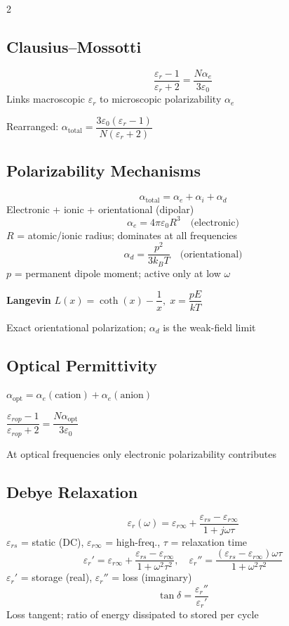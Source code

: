 \documentclass[9pt]{extarticle}
\newcommand{\eqlabel}[1]{\textbf{\scriptsize #1}\;}
\newcommand{\desc}[1]{{\small\color{desc}#1}}
\begin{document}
\begin{multicols}{2}
\subsection{Clausius--Mossotti}
\[\frac{\varepsilon_r - 1}{\varepsilon_r + 2} = \frac{N\alpha_e}{3\varepsilon_0}\]
\desc{Links macroscopic $\varepsilon_r$ to microscopic polarizability $\alpha_e$}

Rearranged: $\alpha_{\text{total}} = \dfrac{3\varepsilon_0(\varepsilon_r - 1)}{N(\varepsilon_r + 2)}$

\subsection{Polarizability Mechanisms}
\[\alpha_{\text{total}} = \alpha_e + \alpha_i + \alpha_d\]
\desc{Electronic + ionic + orientational (dipolar)}
\[\alpha_e = 4\pi\varepsilon_0 R^3 \quad\text{(electronic)}\]
\desc{$R$ = atomic/ionic radius; dominates at all frequencies}
\[\alpha_d = \frac{p^2}{3k_BT} \quad\text{(orientational)}\]
\desc{$p$ = permanent dipole moment; active only at low $\omega$}

\eqlabel{Langevin} $L(x) = \coth(x) - \dfrac{1}{x},\; x = \dfrac{pE}{kT}$

\desc{Exact orientational polarization; $\alpha_d$ is the weak-field limit}

\subsection{Optical Permittivity}
$\alpha_{\text{opt}} = \alpha_e(\text{cation}) + \alpha_e(\text{anion})$

$\dfrac{\varepsilon_{rop}-1}{\varepsilon_{rop}+2} = \dfrac{N\alpha_{\text{opt}}}{3\varepsilon_0}$

\desc{At optical frequencies only electronic polarizability contributes}

\subsection{Debye Relaxation}
\[\varepsilon_r(\omega) = \varepsilon_{r\infty} + \frac{\varepsilon_{rs}-\varepsilon_{r\infty}}{1+j\omega\tau}\]
\desc{$\varepsilon_{rs}$ = static (DC), $\varepsilon_{r\infty}$ = high-freq., $\tau$ = relaxation time}
\[\varepsilon_r' = \varepsilon_{r\infty} + \frac{\varepsilon_{rs}-\varepsilon_{r\infty}}{1+\omega^2\tau^2}, \quad \varepsilon_r'' = \frac{(\varepsilon_{rs}-\varepsilon_{r\infty})\omega\tau}{1+\omega^2\tau^2}\]
\desc{$\varepsilon_r'$ = storage (real), $\varepsilon_r''$ = loss (imaginary)}
\[\tan\delta = \frac{\varepsilon_r''}{\varepsilon_r'}\]
\desc{Loss tangent; ratio of energy dissipated to stored per cycle}


\end{multicols}
\end{document}

